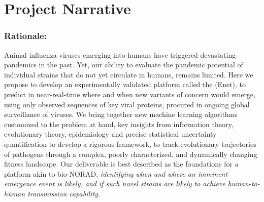 \documentclass[onecolumn, compsoc,12pt]{IEEEtran}
\begin{document}
 


\section*{Project Narrative}

\subsubsection*{Rationale:}
Animal influenza  viruses emerging into humans %
have triggered devastating  pandemics in the past. Yet, our ability to evaluate the pandemic potential of individual strains that do not yet circulate in humans, remains limited. Here we propose to develop an experimentally  validated platform called the \enet (Enet), to predict in near-real-time where and when  new variants of concern would emerge,  using only observed  sequences  of key viral proteins, procured in ongoing global surveillance of \infl viruses. We bring together new machine learning algorithms customized to the problem at hand, key insights from information theory, evolutionary theory, epidemiology and precise statistical  uncertainty quantification to develop a rigorous framework, to  track evolutionary trajectories of pathogens through a complex, poorly characterized, and dynamically changing fitness landscape. Our deliverable is best described as the foundations for a platform akin to bio-NORAD,  \textit{identifying when and where an imminent  emergence event is likely, and if such novel strains are likely to achieve human-to-human transmission capability.}
\end{document}

